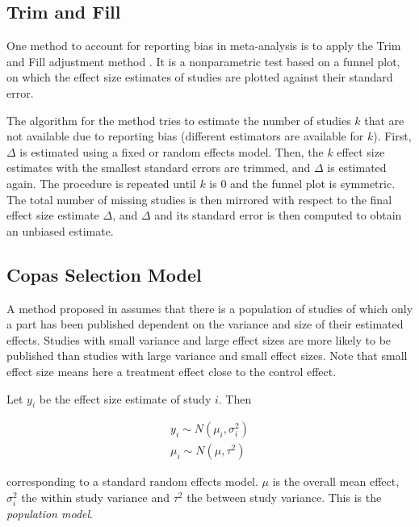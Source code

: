 \documentclass[11pt,a4paper,twoside]{book}\usepackage[]{graphicx}\usepackage[]{color}
\begin{document}
\subsection{Trim and Fill}
One method to account for reporting bias in meta-analysis is to apply the Trim and Fill adjustment method \citep{trimfill}. It is a nonparametric test based on a funnel plot, on which the effect size estimates of studies are plotted against their standard error. 

\vspace{0mm}
The algorithm for the method tries to estimate the number of studies $k$ that are not available due to reporting bias (different estimators are available for $k$). First, $\Delta$ is estimated using a fixed or random effects model. Then, the $k$ effect size estimates with the smallest standard errors are trimmed, and $\Delta$ is estimated again. The procedure is repeated until $k$ is 0 and the funnel plot is symmetric. The total number of missing studies is then mirrored with respect to the final effect size estimate $\Delta$, and $\Delta$ and its standard error is then computed to obtain an unbiased estimate.

\subsection{Copas Selection Model}

A method proposed in \cite{Copas1,Copas2,Copas3} assumes that there is a population of studies of which only a part has been published dependent on the variance and size of their estimated effects. Studies with small variance and large effect sizes are more likely to be published than studies with large variance and small effect sizes. Note that small effect size means here a treatment effect close to the control effect.

Let $y_i$ be the effect size estimate of study $i$. Then 

\begin{align}
y_{i} \sim N(\mu_{i}, \sigma_{i}^2) \\
\mu_{i} \sim N(\mu, \tau^2)
\end{align}

corresponding to a standard random effects model. $\mu$ is the overall mean effect, $\sigma_{i}^2$ the within study variance and $\tau^2$ the between study variance. This is the \textit{population model}.
\end{document}
